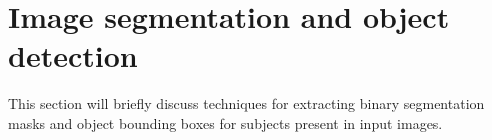 \section{Image segmentation and object detection}

This section will briefly discuss techniques for extracting binary segmentation masks and object bounding boxes for subjects present in input images.
